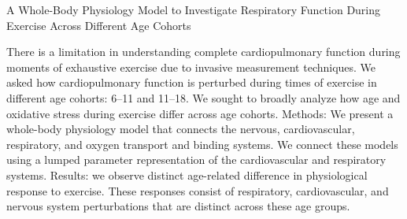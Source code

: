   \cventry
    {A Whole-Body Physiology Model to Investigate Respiratory Function During Exercise Across Different Age Cohorts} %
    {} %
    {} %
    {} %
     {
    \begin{cvitems} %
    \item {There is a limitation in understanding complete cardiopulmonary function during moments of exhaustive exercise due to invasive measurement techniques. We asked how cardiopulmonary function is perturbed during times of exercise in different age cohorts: 6–11 and 11–18. We sought to broadly analyze how age and oxidative stress during exercise differ across age cohorts. Methods: We present a whole-body physiology model that connects the nervous, cardiovascular, respiratory, and oxygen transport and binding systems. We connect these models using a lumped parameter representation of the cardiovascular and respiratory systems. Results: we observe distinct age-related difference in physiological response to exercise. These responses consist of respiratory, cardiovascular, and nervous system perturbations that are distinct across these age groups.}
    \end{cvitems}
     }
